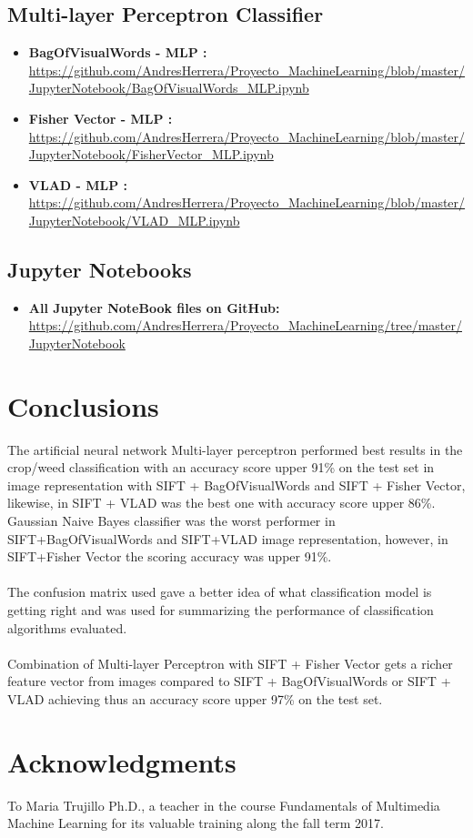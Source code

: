 \documentclass[12pt]{article}
\numberwithin{equation}{section}
\numberwithin{table}{section}
\numberwithin{figure}{section}
\begin{document}
\subsection{Multi-layer Perceptron Classifier }

\begin{itemize}
	\item {\textbf{BagOfVisualWords - MLP :} } \url{https://github.com/AndresHerrera/Proyecto_MachineLearning/blob/master/JupyterNotebook/BagOfVisualWords_MLP.ipynb}
	
	\item {\textbf{Fisher Vector - MLP :} } \url{	https://github.com/AndresHerrera/Proyecto_MachineLearning/blob/master/JupyterNotebook/FisherVector_MLP.ipynb}
	
	\item {\textbf{VLAD - MLP :} } \url{	https://github.com/AndresHerrera/Proyecto_MachineLearning/blob/master/JupyterNotebook/VLAD_MLP.ipynb}
	
\end{itemize}






\subsection{Jupyter Notebooks}
\begin{itemize}
	\item {\textbf{All Jupyter NoteBook files on GitHub:} } \url{https://github.com/AndresHerrera/Proyecto_MachineLearning/tree/master/JupyterNotebook} 
\end{itemize}

	
	
\section{Conclusions}

The artificial neural network Multi-layer perceptron performed best results in the crop/weed classification with an accuracy score upper 91\% on the test set in image representation with SIFT + BagOfVisualWords and SIFT + Fisher Vector, likewise, in SIFT + VLAD  was the best one with accuracy score upper 86\%. Gaussian Naive Bayes classifier was the worst performer in SIFT+BagOfVisualWords and SIFT+VLAD image representation, however, in SIFT+Fisher Vector the scoring accuracy was upper 91\%.\\\\
\noindent
The confusion matrix used gave a better idea of what classification model is getting right and was used for summarizing the performance of classification algorithms evaluated. \\\\
\noindent
Combination of Multi-layer Perceptron with SIFT + Fisher Vector gets a richer feature vector from images compared to SIFT + BagOfVisualWords  or  SIFT + VLAD achieving thus an accuracy score upper 97\% on the test set.



\section*{Acknowledgments}

To Maria Trujillo Ph.D., a teacher in the course Fundamentals of Multimedia Machine Learning for its valuable training along the fall term 2017.
 



\end{document}
